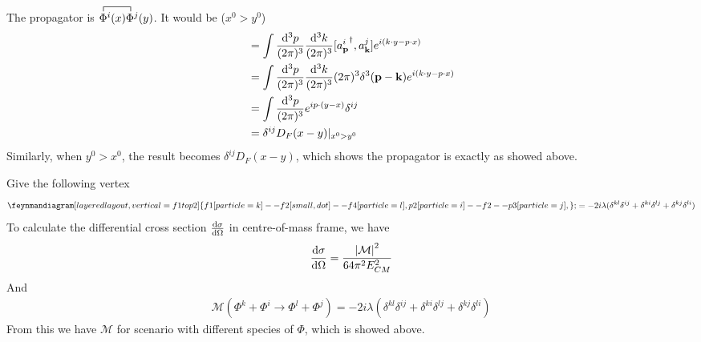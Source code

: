 \documentclass{article}
\newcommand{\s}{\sigma}
\begin{document}
The propagator is $\contraction{}{\Phi}{^i(x)}{\Phi}\Phi^i(x)\Phi^j(y)$. It would be ($x^0>y^0$)
\begin{align*}
  [\Phi^i_+(x),\Phi^j_-(y)]&=\int\frac{\dd^3p}{(2\pi)^3}\frac{\dd^3k}{(2\pi)^3}[{a^i_{\vb{p}}}^{\dagger},a^j_{\vb{k}}]e^{i(k\cdot y-p\cdot x)}\\
  &=\int\frac{\dd^3p}{(2\pi)^3}\frac{\dd^3k}{(2\pi)^3}(2\pi)^3\delta^3(\vb{p-k})e^{i(k\cdot y-p\cdot x)}\\
  &=\int\frac{\dd^3p}{(2\pi)^3}e^{ip\cdot(y-x)}\delta^{ij}\\
  &=\delta^{ij}D_F(x-y)|_{x^0>y^0}
\end{align*}
Similarly, when $y^0>x^0$, the result becomes $\delta^{ij}D_F(x-y)$, which shows the propagator is exactly as showed above.


Give the following vertex
\begin{align*}
\begin{gathered}
    {\feynmandiagram[layered layout, vertical=f1 to p2]{
    f1 [particle=k] -- f2 [small,dot] -- f4 [particle=l] ,
    p2 [particle=i] -- f2 -- p3 [particle=j],
    };}
\end{gathered}
  =-2i\lambda(\delta^{kl}\delta^{ij}+\delta^{ki}\delta^{lj}+\delta^{kj}\delta^{li})
\end{align*}
%
To calculate the differential cross section $\dv{\sigma}{\Omega}$ in centre-of-mass frame, we have
$$\dv{\s}{\Omega}=\frac{\abs{\mathcal{M}}^2}{64\pi^2E_{CM}^2}$$
And
\begin{align*}
  \mathcal{M}(\Phi^k+\Phi^i\rightarrow\Phi^l+\Phi^j)=-2i\lambda(\delta^{kl}\delta^{ij}+\delta^{ki}\delta^{lj}+\delta^{kj}\delta^{li})
\end{align*}
From this we have $\mathcal{M}$ for scenario with different species of $\Phi$, which is showed above.
\end{document}
